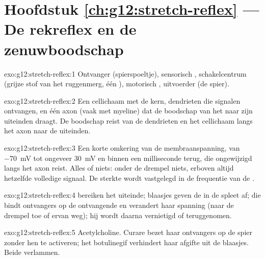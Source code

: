 \section*{Hoofdstuk \ref{ch:g12:stretch-reflex} --- De rekreflex en de zenuwboodschap}

\begin{solution}{exo:g12:stretch-reflex:1}
Ontvanger (spierspoeltje), sensorisch , schakelcentrum (grijze stof
van het ruggenmerg, één ), motorisch , uitvoerder (de spier).
\end{solution}

\begin{solution}{exo:g12:stretch-reflex:2}
Een cellichaam met de kern, dendrieten die signalen ontvangen, en één axon
(vaak met myeline) dat de boodschap van het  naar zijn uiteinden
draagt. De boodschap reist van de dendrieten en het cellichaam langs het
axon naar de uiteinden.
\end{solution}

\begin{solution}{exo:g12:stretch-reflex:3}
Een korte omkering van de membraanspanning, van \qty{-70}{mV} tot ongeveer
\qty{+30}{mV} en binnen een milliseconde terug, die ongewijzigd langs het
axon reist. Alles of niets: onder de drempel niets, erboven altijd
hetzelfde volledige signaal. De sterkte wordt vastgelegd in de frequentie
van de .
\end{solution}

\begin{solution}{exo:g12:stretch-reflex:4}
 bereiken het uiteinde; blaasjes geven de 
in de spleet af; die bindt ontvangers op de ontvangende  en verandert
haar spanning (naar de drempel toe of ervan weg); hij wordt daarna
vernietigd of teruggenomen.
\end{solution}

\begin{solution}{exo:g12:stretch-reflex:5}
Acetylcholine. Curare bezet haar ontvangers op de spier zonder hen te
activeren; het botulinegif verhindert haar afgifte uit de blaasjes. Beide
verlammen.
\end{solution}

